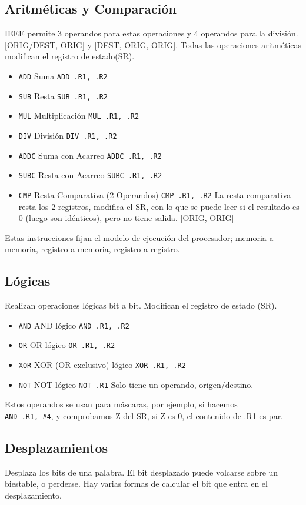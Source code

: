 \documentclass[a4paper,11pt,spanish]{report}
\begin{document}
\subsection{Aritméticas y Comparación}
IEEE permite 3 operandos para estas operaciones y 4 operandos para la división.
[ORIG/DEST, ORIG] y [DEST, ORIG, ORIG]. Todas las operaciones aritméticas modifican el registro de estado(SR).
\begin{itemize}
\item \verb|ADD| Suma \textrightarrow \verb|ADD .R1, .R2|
\item \verb|SUB| Resta \textrightarrow \verb|SUB .R1, .R2|
\item \verb|MUL| Multiplicación \textrightarrow \verb|MUL .R1, .R2|
\item \verb|DIV| División \textrightarrow \verb|DIV .R1, .R2|
\item \verb|ADDC| Suma con Acarreo \textrightarrow \verb|ADDC .R1, .R2|
\item \verb|SUBC| Resta con Acarreo \textrightarrow \verb|SUBC .R1, .R2|
\item \verb|CMP| Resta Comparativa (2 Operandos) \textrightarrow \verb|CMP .R1, .R2| La resta comparativa resta los 2 registros, modifica el SR, con lo que se puede leer si el resultado es 0 (luego son idénticos), pero no tiene salida. [ORIG, ORIG]
\end{itemize}
Estas instrucciones fijan el modelo de ejecución del procesador; memoria a memoria, registro a memoria, registro a registro.
\subsection{Lógicas}
Realizan operaciones lógicas bit a bit. Modifican el registro de estado (SR).
\begin{itemize}
\item \verb|AND| AND lógico \textrightarrow \verb|AND .R1, .R2|
\item \verb|OR| OR lógico \textrightarrow \verb|OR .R1, .R2|
\item \verb|XOR| XOR (OR exclusivo) lógico \textrightarrow \verb|XOR .R1, .R2|
\item \verb|NOT| NOT lógico \textrightarrow \verb|NOT .R1| Solo tiene un operando, origen/destino.
\end{itemize}
Estos operandos se usan para máscaras, por ejemplo, si hacemos \\ \verb|AND .R1, #4|, y comprobamos Z del SR, si Z es 0, el contenido de .R1 es par.
\subsection{Desplazamientos}
Desplaza los bits de una palabra. El bit desplazado puede volcarse sobre un biestable, o perderse. Hay varias formas de calcular el bit que entra en el desplazamiento.
\end{document}
